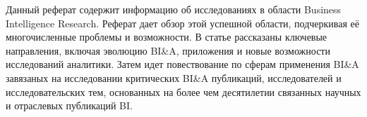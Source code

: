 Данный реферат содержит информацию об исследованиях в области Business Intelligence Research. Реферат дает обзор этой успешной области, подчеркивая её многочисленные проблемы и возможности. В статье рассказаны ключевые направления, включая эволюцию BI\&A, приложения и
новые возможности исследований аналитики. Затем идет повествование по сферам применения BI\&A завязаных на исследовании критических BI\&A публикаций,
исследователей и исследовательских тем, основанных на более чем десятилетии связанных научных и отраслевых публикаций BI.